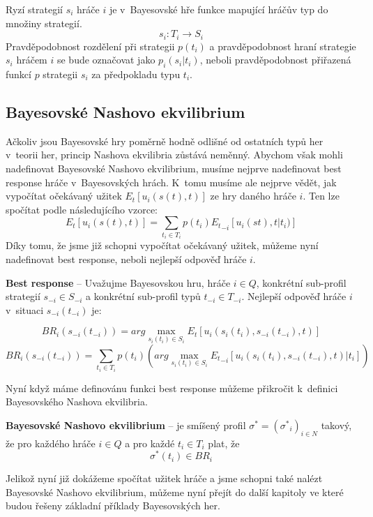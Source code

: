 \documentclass[12pt,a4paper,titlepage,final]{article}
\newcounter{defcounter} \setcounter{defcounter}{0}
\newenvironment{definition}[1][Definice]{\begin{trivlist}
\item[\hskip \labelsep \refstepcounter{defcounter} {\bfseries #1} {\bfseries \arabic{defcounter}}.]}{\end{trivlist}}
\begin{document}
Ryzí strategií $s_i$ hráče $i$ je v~Bayesovské hře funkce mapující hráčův typ do množiny strategií.
$$ s_i : T_i \rightarrow S_i $$
Pravděpodobnost rozdělení při strategii $p(t_i)$ a pravděpodobnost hraní strategie $s_i$ hráčem $i$ se bude označovat jako $p_i(s_i|t_i)$, neboli pravděpodobnost přiřazená funkcí $p$ strategii $s_i$ za předpokladu typu $t_i$.

\subsection{Bayesovské Nashovo ekvilibrium}
Ačkoliv jsou Bayesovské hry poměrně hodně odlišné od ostatních typů her v~teorii her, princip Nashova ekvilibria zůstává neměnný. 
Abychom však mohli nadefinovat Bayesovské Nashovo ekvilibrium, musíme nejprve nadefinovat best response hráče v~Bayesovských hrách.
K~tomu musíme ale nejprve vědět, jak vypočítat očekávaný užitek $E_t[u_i(s(t),t)]$ ze hry daného hráče $i$.
Ten lze spočítat podle následujícího vzorce:
$$ E_t[u_i(s(t),t)] = \sum_{t_i \in T_i}p(t_i){E_t}_{-i} [u_i(st),t|t_i)] $$
Díky tomu, že jsme již schopni vypočítat očekávaný užitek, můžeme nyní nadefinovat best response, neboli nejlepší odpověď hráče $i$.
\begin{definition}
 \textbf{Best response} -- Uvažujme Bayesovskou hru, hráče $i \in Q$, konkrétní sub-profil strategií $s_{-i} \in S_{-i}$ a konkrétní sub-profil typů ${t_{-i} \in T_{-i}}$. Nejlepší odpověď hráče $i$ v~situaci $s_{-i}(t_{-i})$ je:

$$BR_i(s_{-i}(t_{-i})) = arg \max_{s_i(t_i) \in S_i} E_t[u_i(s_i(t_i), s_{-i}(t_{-i}), t)]$$
$$BR_i(s_{-i}(t_{-i})) = \sum_{t_i \in T_i} p(t_i)(arg \max_{s_i(t_i) \in S_i} {E_t}_{-i}[u_i(s_i(t_i), s_{-i}(t_{-i}), t)|t_i])  $$
\end{definition}

Nyní když máme definovánu funkci best response můžeme přikročit k~definici Bayesovského Nashova ekvilibria.

\begin{definition}
  \textbf{Bayesovské Nashovo ekvilibrium} -- je smíšený profil ${\sigma}^* = ({{\sigma}^*}_i)_{i \in N}$ takový, že pro každého hráče $i \in Q$ a pro každé $t_i \in T_i$ plat, že
$${\sigma}^*(t_i) \in BR_i$$
  
\end{definition}

Jelikož nyní již dokážeme spočítat užitek hráče a jsme schopni také nalézt Bayesovské Nashovo ekvilibrium, můžeme nyní přejít do další kapitoly ve které budou řešeny základní příklady Bayesovských her.
\end{document}
